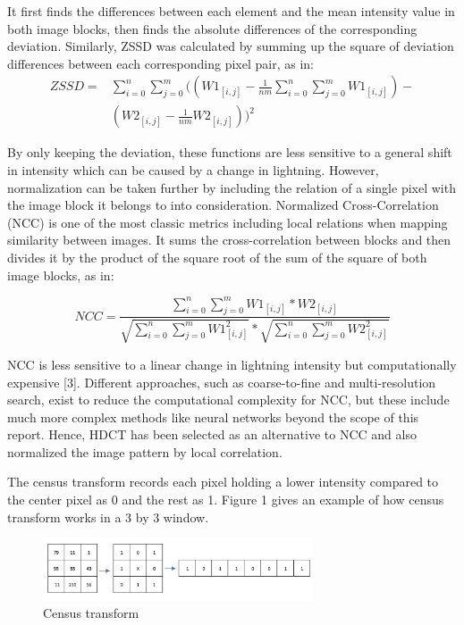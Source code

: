 \documentclass[conference]{IEEEtran}
\begin{document}
It first finds the differences between each element and the mean intensity value in both image blocks, then finds the absolute differences of the corresponding deviation. Similarly, ZSSD was calculated by summing up the square of deviation differences between each corresponding pixel pair, as in:
\begin{equation*}
    \begin{aligned}
        ZSSD= {} & \sum^{n}_{i=0}\sum^{m}_{j=0}((W1_{[i,j]}-\frac{1}{nm}\sum^{n}_{i=0}\sum^{m}_{j=0}W1_{[i,j]})- \\
        & (W2_{[i,j]}-\frac{1}{nm}W2_{[i,j]}))^2
    \end{aligned}
\end{equation*}

By only keeping the deviation, these functions are less sensitive to a general shift in intensity which can be caused by a change in lightning. However, normalization can be taken further by including the relation of a single pixel with the image block it belongs to into consideration. Normalized Cross-Correlation (NCC) is one of the most classic metrics including local relations when mapping similarity between images. It sums the cross-correlation between blocks and then divides it by the product of the square root of the sum of the square of both image blocks, as in:

\begin{equation*}
    NCC=\frac{\sum^{n}_{i=0}\sum^{m}_{j=0}W1_{[i,j]}*W2_{[i,j]}}{\sqrt{\sum^{n}_{i=0}\sum^{m}_{j=0}W1_{[i,j]}^2}*\sqrt{\sum^{n}_{i=0}\sum^{m}_{j=0}W2_{[i,j]}^2}}
\end{equation*}

NCC is less sensitive to a linear change in lightning intensity but computationally expensive [3]. Different approaches, such as coarse-to-fine and multi-resolution search, exist to reduce the computational complexity for NCC, but these include much more complex methods like neural networks beyond the scope of this report. Hence, HDCT has been selected as an alternative to NCC and also normalized the image pattern by local correlation. 

The census transform records each pixel holding a lower intensity compared to the center pixel as 0 and the rest as 1. Figure 1 gives an example of how census transform works in a 3 by 3 window.

\begin{figure}[H]
    \centering
    \includegraphics[width=8cm]{fig1.png}
    \caption{Census transform}
\end{figure}
\end{document}
